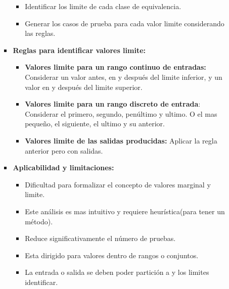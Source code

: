 \documentclass[12pt, twoside, openright]{report} %
\begin{document}
\begin{itemize}
\begin{itemize}
\begin{itemize}
\begin{itemize}
      \item Identificar los limite de cada clase de equivalencia.
        
      \item Generar los casos de prueba para cada valor limite considerando
        las reglas.
        
      \end{itemize}
	  \pagebreak
    \item \textbf{Reglas para identificar valores limite:}
      

      \begin{itemize}
      \item \textbf{Valores limite para un rango continuo de entradas:}
        Considerar un valor antes, en y después del limite inferior, y
        un valor en y después del limite superior.
        
      \item \textbf{Valores limite para un rango discreto de entrada}:
        Considerar el primero, segundo, penúltimo y ultimo. O el mas
        pequeño, el siguiente, el ultimo y su anterior.
        
      \item \textbf{Valores limite de las salidas producidas:} Aplicar la
        regla anterior pero con salidas.
        
      \end{itemize}
    \item \textbf{Aplicabilidad y limitaciones:}
      

      \begin{itemize}
      \item Dificultad para formalizar el concepto de valores marginal y
        limite.
        
      \item Este análisis es mas intuitivo y requiere heurística(para tener
        un método).
        
      \item Reduce significativamente el número de pruebas.
        
      \item Esta dirigido para valores dentro de rangos o conjuntos.
        
      \item La entrada o salida se deben poder partición a y los limites
        identificar.
        
      \end{itemize}
    \end{itemize}
  \end{itemize}
\end{itemize}
\end{document}
